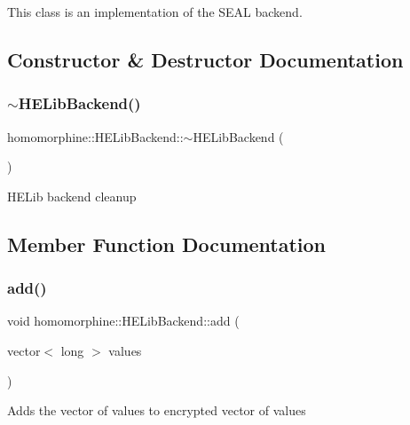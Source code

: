 This class is an implementation of the S\+E\+AL backend. 

\subsection{Constructor \& Destructor Documentation}
\mbox{\label{classhomomorphine_1_1_h_e_lib_backend_a1ef98efe05281fefbe6d044dc474017a}} 
\subsubsection{\texorpdfstring{$\sim$\+H\+E\+Lib\+Backend()}{~HELibBackend()}}
{\footnotesize\ttfamily homomorphine\+::\+H\+E\+Lib\+Backend\+::$\sim$\+H\+E\+Lib\+Backend (\begin{DoxyParamCaption}{ }\end{DoxyParamCaption})}

H\+E\+Lib backend cleanup 

\subsection{Member Function Documentation}
\mbox{\label{classhomomorphine_1_1_h_e_lib_backend_a1e3c4745d7efdaac1f75c5a7fbfc3707}} 
\subsubsection{\texorpdfstring{add()}{add()}\hspace{0.1cm}{\footnotesize\ttfamily [1/2]}}
{\footnotesize\ttfamily void homomorphine\+::\+H\+E\+Lib\+Backend\+::add (\begin{DoxyParamCaption}\item[{vector$<$ long $>$}]{values }\end{DoxyParamCaption})\hspace{0.3cm}{\ttfamily [virtual]}}

Adds the vector of values to encrypted vector of values


